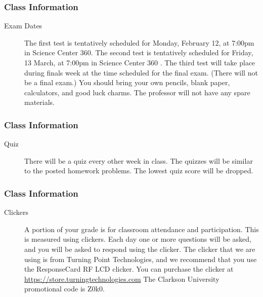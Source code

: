 \begin{frame}
  \frametitle{Class Information}

\begin{description}
  \item[Exam Dates] The first test is tentatively scheduled for
    Monday, February 12, at 7:00pm in Science Center 360. The second
    test is tentatively scheduled for Friday, 13 March, at 7:00pm in
    Science Center 360 . The third test will take place during finals
    week at the time scheduled for the final exam. (There will not be
    a final exam.) You should bring your own pencils, blank paper,
    calculators, and good luck charms.  The professor will not have
    any spare materials.
 
\end{description}

\end{frame}

\begin{frame}
  \frametitle{Class Information}

\begin{description}
\item[Quiz] There will be a quiz every other week in class. The
  quizzes will be similar to the posted homework problems. The lowest
  quiz score will be dropped.
\end{description}

\end{frame}


\begin{frame}
  \frametitle{Class Information}

\begin{description}
  \item[Clickers] A portion of your grade is for classroom attendance
    and participation. This is measured using clickers. Each day one
    or more questions will be asked, and you will be asked to respond
    using the clicker. The clicker that we are using is from Turning
    Point Technologies, and we recommend that you use the ResponseCard
    RF LCD clicker. You can purchase the clicker at
    \url{https://store.turningtechnologies.com} The Clarkson
    University promotional code is Z0k0.

\end{description}

\end{frame}

